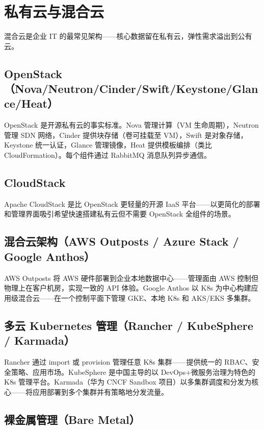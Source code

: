 \documentclass[12pt,UTF8]{ctexbook}
\begin{document}
\chapter{私有云与混合云}
\label{chap:private-hybrid-cloud}

混合云是企业 IT 的最常见架构——核心数据留在私有云，弹性需求溢出到公有云。

  \section{OpenStack（Nova/Neutron/Cinder/Swift/Keystone/Glance/Heat）}

OpenStack 是开源私有云的事实标准。Nova 管理计算（VM 生命周期），Neutron 管理 SDN 网络，Cinder 提供块存储（卷可挂载至 VM），Swift 是对象存储，Keystone 统一认证，Glance 管理镜像，Heat 提供模板编排（类比 CloudFormation）。每个组件通过 RabbitMQ 消息队列异步通信。

  \section{CloudStack}

Apache CloudStack 是比 OpenStack 更轻量的开源 IaaS 平台——以更简化的部署和管理界面吸引希望快速搭建私有云但不需要 OpenStack 全组件的场景。

  \section{混合云架构（AWS Outposts / Azure Stack / Google Anthos）}

AWS Outposts 将 AWS 硬件部署到企业本地数据中心——管理面由 AWS 控制但物理上在客户机房，实现一致的 API 体验。Google Anthos 以 K8s 为中心构建应用级混合云——在一个控制平面下管理 GKE、本地 K8s 和 AKS/EKS 多集群。

  \section{多云 Kubernetes 管理（Rancher / KubeSphere / Karmada）}

Rancher 通过 import 或 provision 管理任意 K8s 集群——提供统一的 RBAC、安全策略、应用市场。KubeSphere 是中国主导的以 DevOps+微服务治理为特色的 K8s 管理平台。Karmada（华为 CNCF Sandbox 项目）以多集群调度和分发为核心——将应用部署到多个集群并有策略地分发流量。

  \section{裸金属管理（Bare Metal）}
\end{document}
